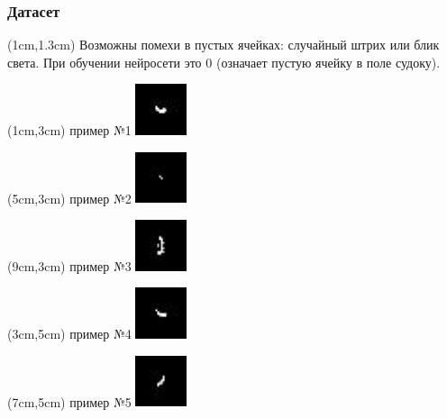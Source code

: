 \documentclass{beamer}
\begin{document}
\begin{frame}
\frametitle{Датасет}
\begin{textblock*}{10cm}(1cm,1.3cm)
Возможны помехи в пустых ячейках: случайный штрих или блик света. При обучении нейросети это 0 (означает пустую ячейку в поле судоку).
\end{textblock*}

\begin{textblock*}{1.5cm}(1cm,3cm)
\tiny пример №1
\includegraphics[width=1.5cm]{0_00032}
\end{textblock*}

\begin{textblock*}{1.5cm}(5cm,3cm)
\tiny пример №2
\includegraphics[width=1.5cm]{0_00116}
\end{textblock*}

\begin{textblock*}{1.5cm}(9cm,3cm)
\tiny пример №3
\includegraphics[width=1.5cm]{0_00118}
\end{textblock*}

\begin{textblock*}{1.5cm}(3cm,5cm)
\tiny пример №4
\includegraphics[width=1.5cm]{0_00010}
\end{textblock*}

\begin{textblock*}{1.5cm}(7cm,5cm)
\tiny пример №5
\includegraphics[width=1.5cm]{0_00021}
\end{textblock*}

\end{frame}
\end{document}

